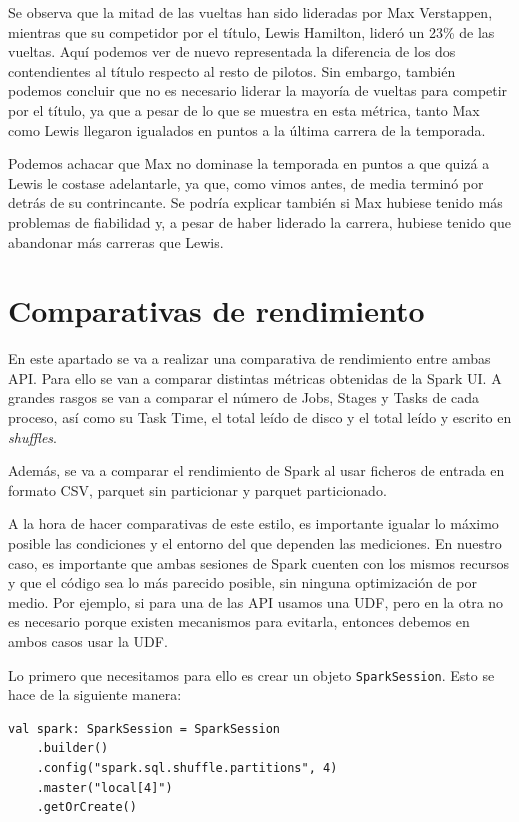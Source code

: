 \documentclass[12pt,twoside,titlepage]{report}
\begin{document}
Se observa que la mitad de las vueltas han sido lideradas por Max Verstappen, mientras que su competidor por el título, Lewis Hamilton, lideró un 23\% de las vueltas. Aquí podemos ver de nuevo representada la diferencia de los dos contendientes al título respecto al resto de pilotos. Sin embargo, también podemos concluir que no es necesario liderar la mayoría de vueltas para competir por el título, ya que a pesar de lo que se muestra en esta métrica, tanto Max como Lewis llegaron igualados en puntos a la última carrera de la temporada. 

Podemos achacar que Max no dominase la temporada en puntos a que quizá a Lewis le costase adelantarle, ya que, como vimos antes, de media terminó por detrás de su contrincante. Se podría explicar también si Max hubiese tenido más problemas de fiabilidad y, a pesar de haber liderado la carrera, hubiese tenido que abandonar más carreras que Lewis.



\section{Comparativas de rendimiento}

En este apartado se va a realizar una comparativa de rendimiento entre ambas API. Para ello se van a comparar distintas métricas obtenidas de la Spark UI. A grandes rasgos se van a comparar el número de Jobs, Stages y Tasks de cada proceso, así como su Task Time, el total leído de disco y el total leído y escrito en \textit{shuffles}.

Además, se va a comparar el rendimiento de Spark al usar ficheros de entrada en formato CSV, parquet sin particionar y parquet particionado.

A la hora de hacer comparativas de este estilo, es importante igualar lo máximo posible las condiciones y el entorno del que dependen las mediciones. En nuestro caso, es importante que ambas sesiones de Spark cuenten con los mismos recursos y que el código sea lo más parecido posible, sin ninguna optimización de por medio. Por ejemplo, si para una de las API usamos una UDF, pero en la otra no es necesario porque existen mecanismos para evitarla, entonces debemos en ambos casos usar la UDF.

Lo primero que necesitamos para ello es crear un objeto \texttt{SparkSession}. Esto se hace de la siguiente manera:

\begin{lstlisting}
val spark: SparkSession = SparkSession
	.builder()
	.config("spark.sql.shuffle.partitions", 4)
	.master("local[4]")
	.getOrCreate()
\end{lstlisting}
\end{document}
